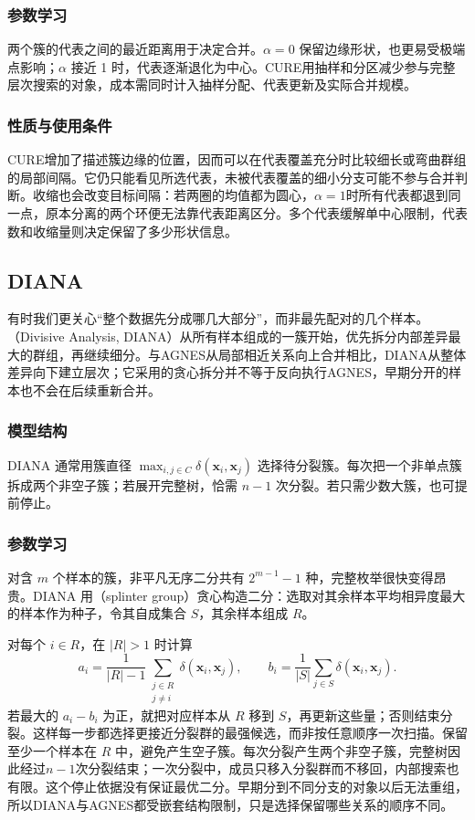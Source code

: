 \subsubsection{参数学习}

两个簇的代表之间的最近距离用于决定合并。$\alpha=0$ 保留边缘形状，也更易受极端点影响；$\alpha$ 接近 1 时，代表逐渐退化为中心。CURE用抽样和分区减少参与完整层次搜索的对象，成本需同时计入抽样分配、代表更新及实际合并规模。

\subsubsection{性质与使用条件}

CURE增加了描述簇边缘的位置，因而可以在代表覆盖充分时比较细长或弯曲群组的局部间隔。它仍只能看见所选代表，未被代表覆盖的细小分支可能不参与合并判断。收缩也会改变目标间隔：若两圈的均值都为圆心，$\alpha=1$时所有代表都退到同一点，原本分离的两个环便无法靠代表距离区分。多个代表缓解单中心限制，代表数和收缩量则决定保留了多少形状信息。
\subsection{DIANA}

有时我们更关心“整个数据先分成哪几大部分”，而非最先配对的几个样本。（Divisive Analysis, DIANA）从所有样本组成的一簇开始，优先拆分内部差异最大的群组，再继续细分。与AGNES从局部相近关系向上合并相比，DIANA从整体差异向下建立层次；它采用的贪心拆分并不等于反向执行AGNES，早期分开的样本也不会在后续重新合并。

\subsubsection{模型结构}

DIANA 通常用簇直径 $\max_{i,j\in C}\delta(\bm{x}_i,\bm{x}_j)$ 选择待分裂簇。每次把一个非单点簇拆成两个非空子簇；若展开完整树，恰需 $n-1$ 次分裂。若只需少数大簇，也可提前停止。

\subsubsection{参数学习}

对含 $m$ 个样本的簇，非平凡无序二分共有 $2^{m-1}-1$ 种，完整枚举很快变得昂贵。DIANA 用（splinter group）贪心构造二分：选取对其余样本平均相异度最大的样本作为种子，令其自成集合 $S$，其余样本组成 $R$。

对每个 $i\in R$，在 $|R|>1$ 时计算
\[
 a_i=\frac{1}{|R|-1}\sum_{\substack{j\in R\\j\ne i}}
 \delta(\bm{x}_i,\bm{x}_j),\qquad
 b_i=\frac{1}{|S|}\sum_{j\in S}\delta(\bm{x}_i,\bm{x}_j).
\]
若最大的 $a_i-b_i$ 为正，就把对应样本从 $R$ 移到 $S$，再更新这些量；否则结束分裂。这样每一步都选择更接近分裂群的最强候选，而非按任意顺序一次扫描。保留至少一个样本在 $R$ 中，避免产生空子簇。每次分裂产生两个非空子簇，完整树因此经过$n-1$次分裂结束；一次分裂中，成员只移入分裂群而不移回，内部搜索也有限。这个停止依据没有保证最优二分。早期分到不同分支的对象以后无法重组，所以DIANA与AGNES都受嵌套结构限制，只是选择保留哪些关系的顺序不同。
